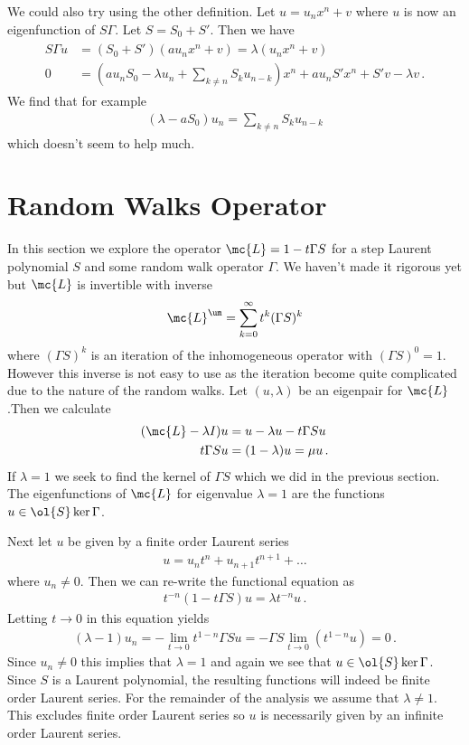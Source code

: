 We could also try using the other definition. Let $u = u_nx^n + v$ where $u$ is now an eigenfunction of $S\Gamma$. Let $S = S_0 + S'$. Then we have
\begin{align}\begin{split}
	S\Gamma u &= (S_0+S')(au_nx^n+v) = \lambda(u_nx^n+v)\\
	0&=(au_nS_0-\lambda u_n+\sum_{k\neq n}S_k u_{n-k})x^n  + au_nS'x^n+S'v-\lambda v \,.
\end{split}\end{align}
We find that for example
\begin{align}
	(\lambda - a S_0)u_n = \sum_{k\neq n}S_k u_{n-k}
\end{align}
which doesn't seem to help much. 

\section{Random Walks Operator}
In this section we explore the operator $\mc{L} = 1 - t\Gamma S$ for a step Laurent polynomial $S$ and some random walk operator $\Gamma$. We haven't made it rigorous yet but $\mc{L}$ is invertible with inverse
\begin{align}
	{\mc{L}}^{\um} = \sum_{k=0}^{\infty}t^k(\Gamma S)^k
\end{align}
where $(\Gamma S)^k$ is an iteration of the inhomogeneous operator with $(\Gamma S)^0 = 1$. However this inverse is not easy to use as the iteration become quite complicated due to the nature of the random walks. Let $(u, \lambda)$ be an eigenpair for $\mc{L}$.Then we calculate
\begin{align}\begin{split}
	(\mc{L}-\lambda I) u &= u - \lambda u -t\Gamma Su\\
	t \Gamma S u &= (1-\lambda)u = \mu u\,.
\end{split}\end{align}
If $\lambda = 1$ we seek to find the kernel of $\Gamma S$ which we did in the previous section. The eigenfunctions of $\mc{L}$ for eigenvalue $\lambda = 1$ are the functions $u \in \ol{S}\ker{\Gamma}$.

Next let $u$ be given by a finite order Laurent series
\begin{align}
	u = u_n t^n + u_{n+1}t^{n+1} + \ldots
\end{align}
where $u_n \neq 0$. Then we can re-write the functional equation as
\begin{align}
	t^{-n}(1-t\Gamma S)u = \lambda t^{-n}u\,.
\end{align}
Letting $t \to 0$ in this equation yields
\begin{align}
	(\lambda - 1)u_n = -\lim_{t\to 0} t^{1-n}\Gamma S u = -\Gamma S \lim_{t\to 0} (t^{1-n} u) = 0\,.
\end{align}
Since $u_n \neq 0$ this implies that $\lambda = 1$ and again we see that $u \in \ol{S}\ker \Gamma$. Since $S$ is a Laurent polynomial, the resulting functions will indeed be finite order Laurent series. For the remainder of the analysis we assume that $\lambda \neq 1$. This excludes finite order Laurent series so $u$ is necessarily given by an infinite order Laurent series.


